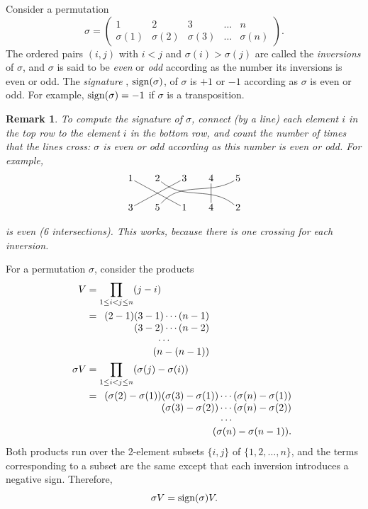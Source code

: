 \documentclass[a4paper,11pt,final,openany]{memoir}%
\newtheorem{remark}[X]{Remark}
\theoremstyle{nonumberplain}
\begin{document}
Consider a permutation
\[
\sigma=%
\begin{pmatrix}
1 & 2 & 3 & \ldots & n\\
\sigma(1) & \sigma(2) & \sigma(3) & \ldots & \sigma(n)
\end{pmatrix}
.
\]
The ordered pairs $(i,j)$ with $i<j$ and $\sigma(i)>\sigma(j)$ are called the
\emph{inversions}%
of $\sigma$, and $\sigma$ is said to be \emph{even\/}%
or \emph{odd\/}%
according as the number its inversions is even or odd. The \emph{signature}%
%
, $\operatorname{sign}(\sigma)$,\/ of $\sigma$ is $+1$ or $-1$ according as $\sigma$ is even
or odd. For example, $\operatorname{sign}(\sigma)=-1$ if $\sigma$ is a transposition.

\begin{remark}
\noindent\label{ga20r}To compute the signature of $\sigma$, connect (by a
line) each element $i$ in the top row to the element $i$ in the bottom row,
and count the number of times that the lines cross: $\sigma$ is even or odd
according as this number is even or odd. For example,
\[
\begin{tikzpicture}[inner sep=1pt]
\matrix(m)[matrix of math nodes, row sep=2em, column sep=2em,
text height=1.5ex, text depth=0.25ex]
{1&2&3&4&5\\
3&5&1&4&2\\};
\path[-]
(m-1-1) edge (m-2-3)
(m-1-2) edge[out=320,in=140] (m-2-5)
(m-1-3) edge (m-2-1)
(m-1-4) edge (m-2-4)
(m-1-5) edge[out=210,in=50] (m-2-2);
\end{tikzpicture}
\]
is even (6 intersections). This works, because there is one crossing for each inversion.
\end{remark}

For a permutation $\sigma$, consider the products
\begin{align*}
V&=\prod_{1\leq i<j\leq n}(j-i)  \\
 &=%
\begin{array}
[t]{r}%
(2-1)(3-1)\cdots(n-1)\\
(3-2)\cdots(n-2)\\
\cdots\qquad\qquad\\
(n-(n-1))
\end{array}
\\
\sigma V&=\prod_{1\leq i<j\leq n}(\sigma(j)-\sigma(i))  \\
  &=%
\begin{array}
[t]{r}%
(\sigma(2)-\sigma(1))(\sigma(3)-\sigma(1))\cdots(\sigma(n)-\sigma(1))\\
(\sigma(3)-\sigma(2))\cdots(\sigma(n)-\sigma(2))\\
\cdots\qquad\qquad\qquad\\
(\sigma(n)-\sigma(n-1)).
\end{array}
\end{align*}
Both products run over the 2-element subsets $\{i,j\}$ of $\{1,2,\ldots,n\}$,
and the terms corresponding to a subset are the same except that each
inversion introduces a negative sign. Therefore,%
\[
\sigma V=\operatorname{sign}(\sigma)V.
\]
\end{document}
